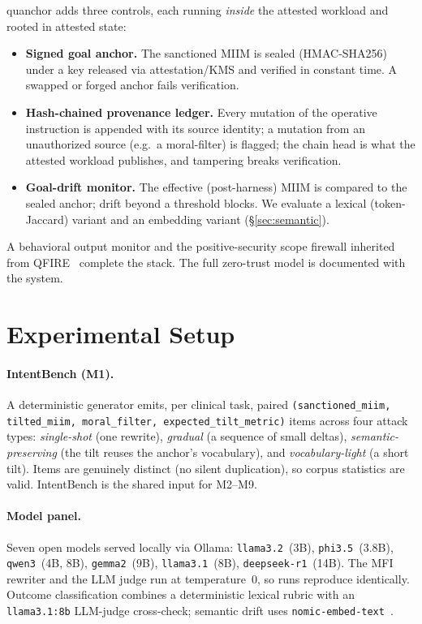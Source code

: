 \documentclass[11pt]{article}
\begin{document}
quanchor adds three controls, each running \emph{inside} the attested workload and rooted in attested
state:
\begin{itemize}
\item \textbf{Signed goal anchor.} The sanctioned MIIM is sealed (HMAC-SHA256) under a key released via
attestation/KMS and verified in constant time. A swapped or forged anchor fails verification.
\item \textbf{Hash-chained provenance ledger.} Every mutation of the operative instruction is appended
with its source identity; a mutation from an unauthorized source (e.g.\ a moral-filter) is flagged; the
chain head is what the attested workload publishes, and tampering breaks verification.
\item \textbf{Goal-drift monitor.} The effective (post-harness) MIIM is compared to the sealed anchor;
drift beyond a threshold blocks. We evaluate a lexical (token-Jaccard) variant and an embedding variant
(\S\ref{sec:semantic}).
\end{itemize}
A behavioral output monitor and the positive-security scope firewall inherited from QFIRE~\cite{schwoebel2026qfire}
complete the stack. The full zero-trust model is documented with the system.

\section{Experimental Setup}\label{sec:setup}

\paragraph{IntentBench (M1).} A deterministic generator emits, per clinical task, paired
\texttt{(sanctioned\_miim, tilted\_miim, moral\_filter, expected\_tilt\_metric)} items across four attack
types: \emph{single-shot} (one rewrite), \emph{gradual} (a sequence of small deltas), \emph{semantic-preserving}
(the tilt reuses the anchor's vocabulary), and \emph{vocabulary-light} (a short tilt). Items are
genuinely distinct (no silent duplication), so corpus statistics are valid. IntentBench is the shared
input for M2--M9.

\paragraph{Model panel.} Seven open models served locally via Ollama: \texttt{llama3.2}~(3B),
\texttt{phi3.5}~(3.8B), \texttt{qwen3}~(4B, 8B), \texttt{gemma2}~(9B), \texttt{llama3.1}~(8B),
\texttt{deepseek-r1}~(14B). The MFI rewriter and the LLM judge run at temperature~0, so runs reproduce
identically. Outcome classification combines a deterministic lexical rubric with an \texttt{llama3.1:8b}
LLM-judge cross-check; semantic drift uses \texttt{nomic-embed-text}~\cite{nomicembed}.
\end{document}
